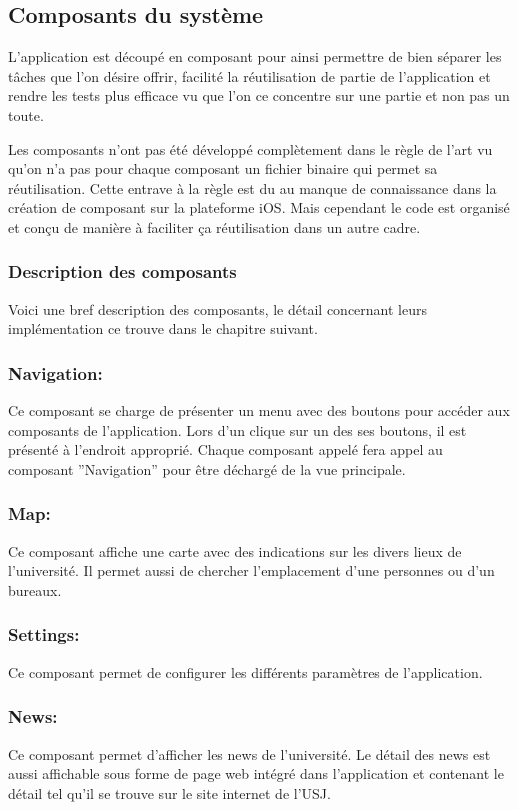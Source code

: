 			 
	\subsection{Composants du système}
		L'application est découpé en composant pour ainsi permettre de bien séparer les tâches que l'on désire offrir, facilité la réutilisation de partie de l'application et rendre les tests plus efficace vu que l'on ce concentre sur une partie et non pas un toute.
		
		Les composants n'ont pas été développé complètement dans le règle de l'art vu qu'on  n'a pas pour chaque composant un fichier binaire qui permet sa réutilisation. Cette entrave à la règle est du au manque de connaissance dans la création de composant  sur la plateforme iOS. Mais cependant le code est organisé et conçu de manière à faciliter ça réutilisation dans un autre cadre.
		
		\subsubsection{Description des composants}
		Voici une bref description des composants, le détail concernant leurs implémentation ce trouve dans le chapitre suivant.
		\subsubsection*{Navigation:}
		Ce composant se charge de présenter un menu avec des boutons pour accéder aux composants de l'application. Lors d'un clique sur un des ses boutons, il est présenté à l'endroit approprié. Chaque composant appelé fera appel au composant ''Navigation'' pour être déchargé de la vue principale.
		\subsubsection*{Map:}
		Ce composant affiche une carte avec des indications sur les divers lieux de l'université. Il permet aussi de chercher l'emplacement d'une personnes ou d'un bureaux.
		\subsubsection*{Settings:}
		Ce composant permet de configurer les différents paramètres de l'application.
		\subsubsection*{News:}
		Ce composant permet d'afficher les news de l'université. Le détail des news est aussi affichable sous forme de page web intégré dans l'application et contenant le détail tel qu'il se trouve sur le site internet de l'USJ. 
